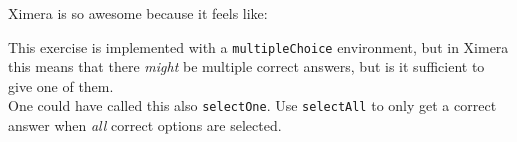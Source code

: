 \documentclass{ximera}
\begin{document}
\begin{exercise}
    Ximera is so awesome because it feels like:
    \begin{multipleChoice}
    \end{multipleChoice}
    \begin{feedback}
        This exercise is implemented with a \verb|multipleChoice| environment,
        but in Ximera this means that there \textit{might} be multiple correct answers,
        but is it sufficient to give one of them.
        \\
        One could have called this also \verb|selectOne|. 
        Use \verb|selectAll| to only get a correct answer when \textit{all} correct options are selected.
        
    \end{feedback}
\end{exercise}
\end{document}
